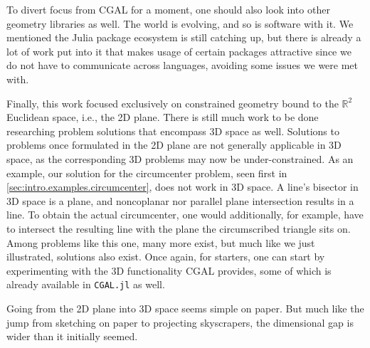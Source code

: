 To divert focus from \ac{CGAL} for a moment, one should also look into other
geometry libraries as well.  The world is evolving, and so is software with it.
We mentioned the Julia package ecosystem is still catching up, but there is
already a lot of work put into it that makes usage of certain packages
attractive since we do not have to communicate across languages, avoiding some
issues we were met with.

Finally, this work focused exclusively on constrained geometry bound to the
$\mathbb{R}^2$ Euclidean space, i.e., the 2D plane.  There is still much work to
be done researching problem solutions that encompass 3D space as well.
Solutions to problems once formulated in the 2D plane are not generally
applicable in 3D space, as the corresponding 3D problems may now be
under-constrained.  As an example, our solution for the circumcenter problem,
seen first in \cref{sec:intro.examples.circumcenter}, does not work in 3D space.
A line's bisector in 3D space is a plane, and noncoplanar nor parallel plane
intersection results in a line.  To obtain the actual circumcenter, one would
additionally, for example, have to intersect the resulting line with the plane
the circumscribed triangle sits on.  Among problems like this one, many more
exist, but much like we just illustrated, solutions also exist.  Once again, for
starters, one can start by experimenting with the 3D functionality \ac{CGAL}
provides, some of which is already available in \texttt{CGAL.jl} as well.

Going from the 2D plane into 3D space seems simple on paper.  But much like the
jump from sketching on paper to projecting skyscrapers, the dimensional gap is
wider than it initially seemed.
